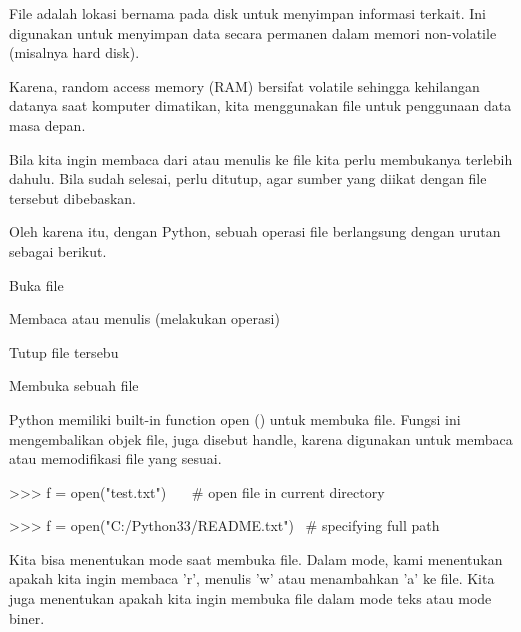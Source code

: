 \documentclass[a4paper,12pt]{report}
\begin{document}
\vspace{12pt}
\vspace{12pt}
\vspace{14pt}
\noindent 
File adalah lokasi bernama pada disk untuk menyimpan informasi terkait. Ini digunakan untuk menyimpan data secara permanen dalam memori non-volatile (misalnya hard disk). \par
\noindent 
\vspace{12pt}
\noindent 
Karena, random access memory (RAM) bersifat volatile sehingga kehilangan datanya saat komputer dimatikan, kita menggunakan file untuk penggunaan data masa depan. \par
\noindent 
\vspace{12pt}
\noindent 
Bila kita ingin membaca dari atau menulis ke file kita perlu membukanya terlebih dahulu. Bila sudah selesai, perlu ditutup, agar sumber yang diikat dengan file tersebut dibebaskan. \par
\noindent 
\vspace{12pt}
\noindent 
Oleh karena itu, dengan Python, sebuah operasi file berlangsung dengan urutan sebagai berikut. \par
\vspace{12pt}
\noindent 
\begin{myEnumerate}
\item Buka file \par
\noindent 
\item Membaca atau menulis (melakukan operasi) \par
\noindent 
\item Tutup file tersebu\end{myEnumerate}
 \par
\vspace{12pt}
\vspace{12pt}
\vspace{12pt}
\noindent 
Membuka sebuah file \par
\noindent 
Python memiliki built-in function open () untuk membuka file. Fungsi ini mengembalikan objek file, juga disebut handle, karena digunakan untuk membaca atau memodifikasi file yang sesuai. \par
\vspace{12pt}
\noindent 
>>> f = open("test.txt")~~~  $  \#  $ open file in current directory \par
\noindent 
>>> f = open("C:/Python33/README.txt")~  $  \#  $ specifying full path \par
\vspace{12pt}
\noindent 
Kita bisa menentukan mode saat membuka file. Dalam mode, kami menentukan apakah kita ingin membaca 'r', menulis 'w' atau menambahkan 'a' ke file. Kita juga menentukan apakah kita ingin membuka file dalam mode teks atau mode biner. \par
\end{document}
